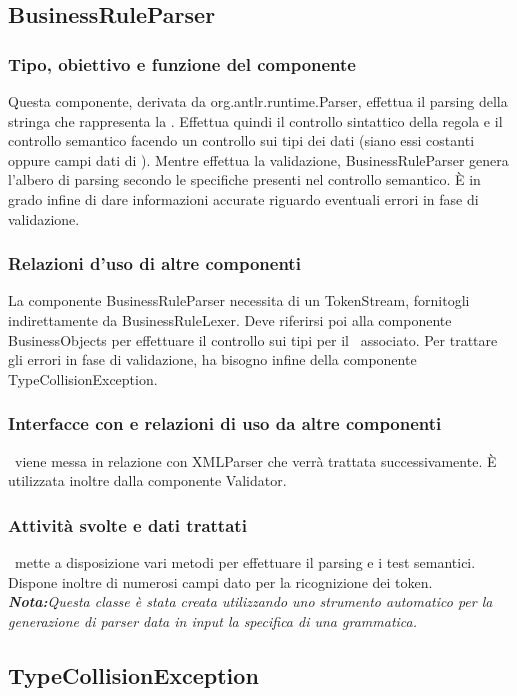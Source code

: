 \documentclass[11pt,titlepage,a4paper]{report}
\begin{document}
\subsection{BusinessRuleParser}
\subsubsection{Tipo, obiettivo e funzione del componente}
Questa componente, derivata da org.antlr.runtime.Parser, effettua il parsing della stringa che rappresenta la \br. Effettua quindi il controllo sintattico della regola e il controllo semantico facendo un controllo sui tipi dei dati (siano essi costanti oppure campi dati di \bos). Mentre effettua la validazione, BusinessRuleParser genera l'albero di parsing secondo le specifiche presenti nel controllo semantico. \`E in grado infine di dare informazioni accurate riguardo eventuali errori in fase di validazione.
\subsubsection{Relazioni d'uso di altre componenti}
La componente BusinessRuleParser necessita di un TokenStream, fornitogli indirettamente da BusinessRuleLexer. Deve riferirsi poi alla componente BusinessObjects per effettuare il controllo sui tipi per il \bo\ associato. Per trattare gli errori in fase di validazione, ha bisogno infine della componente TypeCollisionException.
\subsubsection{Interfacce con e relazioni di uso da altre componenti}
\brp\ viene messa in relazione con XMLParser che verr\`a trattata successivamente.
\`E utilizzata inoltre dalla componente Validator.
\subsubsection{Attivit\`a svolte e dati trattati}
\brp\ mette a disposizione vari metodi per effettuare il parsing e i test semantici. Dispone inoltre di numerosi campi dato per la ricognizione dei token.\\
\textit{\textbf{Nota:}Questa classe \`e stata creata utilizzando uno strumento automatico per la generazione di parser data in input la specifica di una grammatica.}

\subsection{TypeCollisionException}
\end{document}

